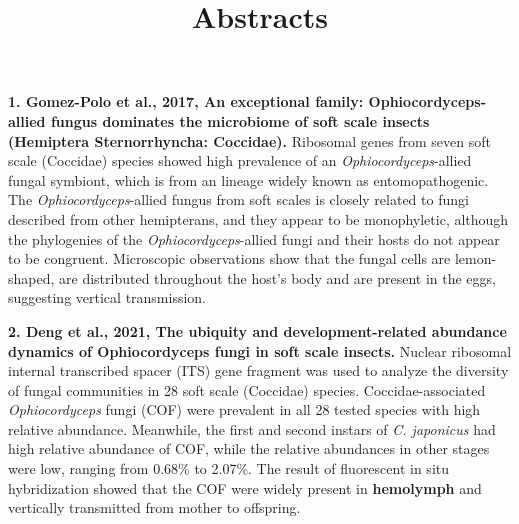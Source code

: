 \documentclass[11pt]{article}
\title{Abstracts}
\author{}
\date{}
\begin{document}
\begin{sloppypar}
  \maketitle

  \linenumbers

\textbf{1. Gomez-Polo et al., 2017, An exceptional family: Ophiocordyceps-allied fungus dominates the microbiome of soft scale insects (Hemiptera Sternorrhyncha: Coccidae).} \newline
Ribosomal genes from seven soft scale (Coccidae) species showed high prevalence of an \textit{Ophiocordyceps}-allied fungal symbiont, which is from an lineage widely known as entomopathogenic. 
The \textit{Ophiocordyceps}-allied fungus from soft scales is closely related to fungi described from other hemipterans, and they appear to be monophyletic, although the phylogenies of the \textit{Ophiocordyceps}-allied fungi and their hosts do not appear to be congruent. 
Microscopic observations show that the fungal cells are lemon-shaped, are distributed throughout the host’s body and are
present in the eggs, suggesting vertical transmission.

\par

\textbf{2. Deng et al., 2021, The ubiquity and development-related abundance dynamics of Ophiocordyceps fungi in soft scale insects.} \newline
Nuclear ribosomal internal transcribed spacer (ITS) gene fragment was used to analyze the diversity of fungal communities in 28 soft scale (Coccidae) species. 
Coccidae-associated \textit{Ophiocordyceps} fungi (COF) were prevalent in all 28 tested species with high relative abundance. 
Meanwhile, the first and second instars of \textit{C. japonicus} had high relative abundance of COF, while the relative
abundances in other stages were low, ranging from 0.68\% to 2.07\%. 
The result of fluorescent in situ hybridization showed that the COF were widely present in \textbf{hemolymph} and vertically transmitted from mother to offspring. 

\end{sloppypar}
\end{document}

